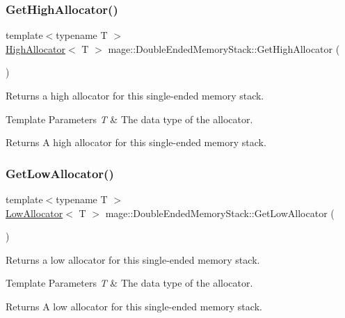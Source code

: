 \subsubsection{\texorpdfstring{Get\+High\+Allocator()}{GetHighAllocator()}}
{\footnotesize\ttfamily template$<$typename T $>$ \\
\mbox{\hyperlink{classmage_1_1_double_ended_memory_stack_1_1_high_allocator}{High\+Allocator}}$<$ T $>$ mage\+::\+Double\+Ended\+Memory\+Stack\+::\+Get\+High\+Allocator (\begin{DoxyParamCaption}{ }\end{DoxyParamCaption})\hspace{0.3cm}{\ttfamily [noexcept]}}

Returns a high allocator for this single-\/ended memory stack.


\begin{DoxyTemplParams}{Template Parameters}
{\em T} & The data type of the allocator. \\
\hline
\end{DoxyTemplParams}
\begin{DoxyReturn}{Returns}
A high allocator for this single-\/ended memory stack. 
\end{DoxyReturn}
\mbox{\label{classmage_1_1_double_ended_memory_stack_aa83468994c7becc35c90081f932e37f2}} 
\subsubsection{\texorpdfstring{Get\+Low\+Allocator()}{GetLowAllocator()}}
{\footnotesize\ttfamily template$<$typename T $>$ \\
\mbox{\hyperlink{classmage_1_1_double_ended_memory_stack_1_1_low_allocator}{Low\+Allocator}}$<$ T $>$ mage\+::\+Double\+Ended\+Memory\+Stack\+::\+Get\+Low\+Allocator (\begin{DoxyParamCaption}{ }\end{DoxyParamCaption})\hspace{0.3cm}{\ttfamily [noexcept]}}

Returns a low allocator for this single-\/ended memory stack.


\begin{DoxyTemplParams}{Template Parameters}
{\em T} & The data type of the allocator. \\
\hline
\end{DoxyTemplParams}
\begin{DoxyReturn}{Returns}
A low allocator for this single-\/ended memory stack. 
\end{DoxyReturn}
\mbox{\label{classmage_1_1_double_ended_memory_stack_a87ca430feb41c8710855012e87a955c2}} 
